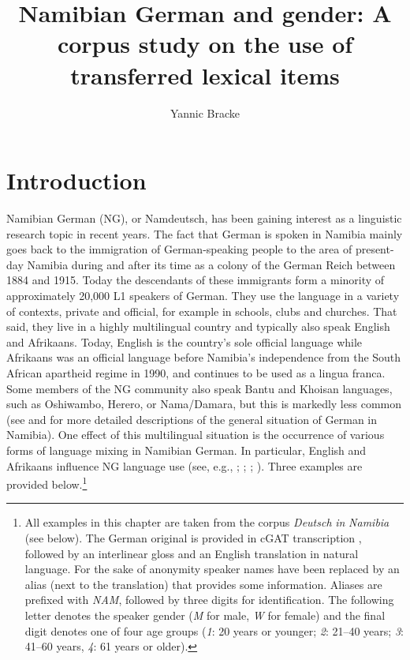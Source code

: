 \documentclass[output=paper]{langsci/langscibook}
\author{Yannic Bracke\affiliation{Friedrich-Schiller-Universität Jena}}
\title[Namibian German and gender]{Namibian German and gender: A corpus study on the use of transferred lexical items}
\begin{document}
\maketitle 


 
\section{Introduction}
 \label{sec:bracke:1}

Namibian German (NG), or Namdeutsch, has been gaining interest as a linguistic research topic in recent years. The fact that German is spoken in Namibia mainly goes back to the immigration of German-speaking people to the area of present-day Namibia during and after its time as a colony of the German Reich between 1884 and 1915. Today the descendants of these immigrants form a minority of approximately 20,000 L1 speakers of German. They use the language in a variety of contexts, private and official, for example in schools, clubs and churches. That said, they live in a highly multilingual country and typically also speak English and Afrikaans. Today, English is the country’s sole official language while Afrikaans was an official language before Namibia’s independence from the South African apartheid regime in 1990, and continues to be used as a lingua franca. Some members of the NG community also speak Bantu and Khoisan languages, such as Oshiwambo, Herero, or Nama/Damara, but this is markedly less common (see \citealt{shah_german_2018} and \citealt{zimmer_deutsch_2019} for more detailed descriptions of the general situation of German in Namibia). One effect of this multilingual situation is the occurrence of various forms of language mixing in Namibian German. In particular, English and Afrikaans influence NG language use (see, e.g., \citealt[22]{shah_german_2007}; \citealt{wiese_deutsch_2014}; \citealt{wiese_german_2017}; \citealt[1185--1187]{zimmer_deutsch_2019}). Three examples are provided below.\footnote{All examples in this chapter are taken from the corpus \textit{Deutsch} \textit{in} \textit{Namibia} (see below). The German original is provided in cGAT transcription \citep{schmidt_cgat_2015}, followed by an interlinear gloss and an English translation in natural language. For the sake of anonymity speaker names have been replaced by an alias (next to the translation) that provides some information. Aliases are prefixed with \textit{NAM}, followed by three digits for identification. The following letter denotes the speaker gender (\textit{M} for male, \textit{W} for female) and the final digit denotes one of four age groups (\textit{1}: 20 years or younger; \textit{2}: 21--40 years; \textit{3}: 41--60 years, \textit{4}: 61 years or older).}
\end{document}
